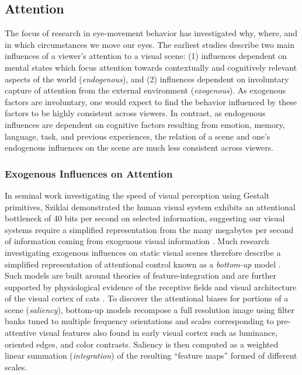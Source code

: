 \subsection{Attention}

The focus of research in eye-movement behavior has investigated why, where, and in which circumstances we move our eyes.  The earliest studies \cite{Buswell1935,Yarbus1967} describe two main influences of a viewer's attention to a visual scene: (1) influences dependent on mental states which focus attention towards contextually and cognitively relevant aspects of the world (\textit{endogenous}), and (2) influences dependent on involuntary capture of attention from the external environment (\textit{exogenous}).  As exogenous factors are involuntary, one would expect to find the behavior influenced by these factors to be highly consistent across viewers.  In contrast, as endogenous influences are dependent on cognitive factors resulting from emotion, memory, language, task, and previous experiences, the relation of a scene and one's endogenous influences on the scene are much less consistent across viewers.  

\subsubsection{Exogenous Influences on Attention}

In seminal work investigating the speed of visual perception using Gestalt primitives, Sziklai demonstrated the human visual system exhibits an attentional bottleneck of 40 bits per second on selected information, suggesting our visual systems require a simplified representation from the many megabytes per second of information coming from exogenous visual information \cite{Sziklai1956,Merrill1968}.  Much research investigating exogenous influences on static visual scenes therefore describe a simplified representation of attentional control known as a \textit{bottom-up} model \cite{Koch1985,Itti1998,Wolfe1989,Itti2001}.  Such models are built around theories of feature-integration \cite{Treisman1980} and are further supported by physiological evidence of the receptive fields and visual architecture of the visual cortex of cats \cite{Hubel1962}.  To discover the attentional biases for portions of a scene (\textit{saliency}), bottom-up models recompose a full resolution image using filter banks tuned to multiple frequency orientations and scales corresponding to pre-attentive visual features also found in early visual cortex such as luminance, oriented edges, and color contrasts.  Saliency is then computed as a weighted linear summation (\textit{integration}) of the resulting ``feature maps'' formed of different scales. 

